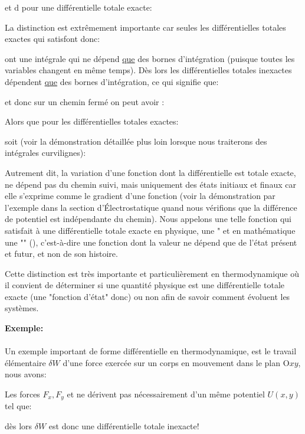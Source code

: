 	et $\mathrm{d}$ pour une différentielle totale exacte:
	
	La distinction est extrêmement importante car seules les différentielles totales exactes qui satisfont donc:
	
	ont une intégrale qui ne dépend \underline{que} des bornes d'intégration (puisque toutes les variables changent en même temps). Dès lors les différentielles totales inexactes dépendent \underline{que} des bornes d'intégration, ce qui signifie que:
	
	et donc sur un chemin fermé on peut avoir :
	
	Alors que pour les différentielles totales exactes:
	
	soit (voir la démonstration détaillée plus loin lorsque nous traiterons des intégrales curvilignes):
	
	Autrement dit, la variation d'une fonction dont la différentielle est totale exacte, ne dépend pas du chemin suivi, mais uniquement des états initiaux et finaux car elle s'exprime comme le gradient d'une fonction (voir la démonstration par l'exemple dans la section d'Électrostatique quand nous vérifions que la différence de potentiel est indépendante du chemin). Nous appelons une telle fonction qui satisfait à une différentielle totale exacte en physique, une " et en mathématique une "" (), c'est-à-dire une fonction dont la valeur ne dépend que de l'état présent et futur, et non de son histoire.
	
	Cette distinction est très importante et particulièrement en thermodynamique où il convient de déterminer si une quantité physique est une différentielle totale exacte (une "fonction d'état" donc) ou non afin de savoir comment évoluent les systèmes.
	
	\begin{tcolorbox}[colframe=black,colback=white,sharp corners]
	\textbf{{\Large {}}Exemple:}\\\\
	Un exemple important de forme différentielle en thermodynamique, est le travail élémentaire $\delta W$ d'une force exercée sur un corps en mouvement dans le plan $\text{O}xy$, nous avons:
	
	Les forces $F_x,F_y$ et ne dérivent pas nécessairement d'un même potentiel $U(x, y)$ tel que:
	
	dès lors  $\delta W$ est donc une différentielle totale inexacte!
	\end{tcolorbox}
	
